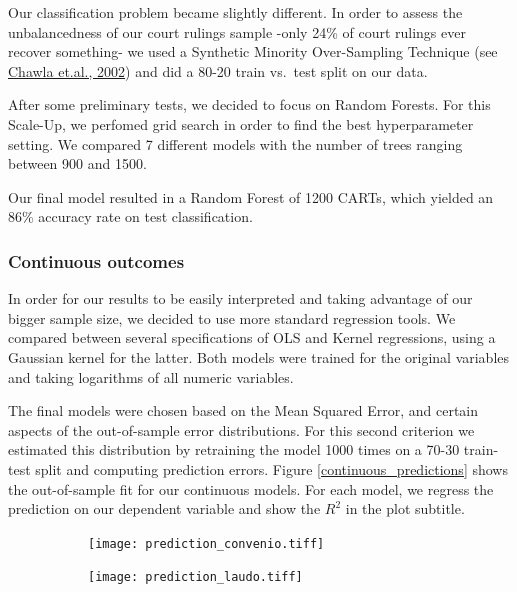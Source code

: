 \documentclass[]{article}
\begin{document}
Our classification problem became slightly different. In order to assess
the unbalancedness of our court rulings sample -only 24\% of court
rulings ever recover something- we used a Synthetic Minority
Over-Sampling Technique (see
\href{http://jair.org/media/953/live-953-2037-jair.pdf}{Chawla et.al., 2002}) and did a 80-20 train vs.~test split on our
data.

After some preliminary tests, we decided to focus on Random Forests. For
this Scale-Up, we perfomed grid search in order to find the best
hyperparameter setting. We compared 7 different models with the number
of trees ranging between 900 and 1500.

Our final model resulted in a Random Forest of 1200 CARTs, which yielded
an 86\% accuracy rate on test classification.

\subsubsection{Continuous outcomes}\label{continuous-outcomes-1}

In order for our results to be easily interpreted and taking advantage
of our bigger sample size, we decided to use more standard regression
tools. We compared between several specifications of OLS and Kernel
regressions, using a Gaussian kernel for the latter. Both models were
trained for the original variables and taking logarithms of all numeric
variables.

The final models were chosen based on the Mean Squared Error, and
certain aspects of the out-of-sample error distributions. For this
second criterion we estimated this distribution by retraining the model
1000 times on a 70-30 train-test split and computing prediction errors. Figure \ref{continuous_predictions} shows the out-of-sample fit for our continuous models. For each model, we regress the prediction on our dependent variable and show the $R^2$ in the plot subtitle. 

\begin{figure}[H]
    \caption{Compensation predictions in the second pilot}
    \label{continuous_predictions}
    \begin{center}
    \begin{subfigure}{0.49\textwidth}
    \centering
        \texttt{[image: prediction\_convenio.tiff]}
     \end{subfigure}
     \begin{subfigure}{0.49\textwidth}
    \centering
        \texttt{[image: prediction\_laudo.tiff]}
     \end{subfigure}
  \end{center}
\end{figure}
\end{document}
